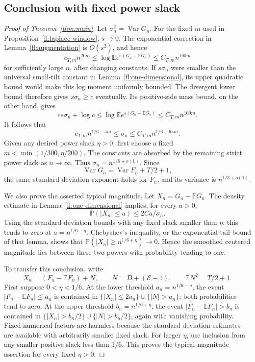 \subsection{Conclusion with fixed power slack}

\begin{proof}[Proof of Theorem~\ref{thm:main}]
Let $\sigma_n^2=\operatorname{Var}G_n$.  For the fixed $m$ used in
Proposition~\ref{fl:laplace-window}, $s\to0$.  The exponential
correction in Lemma~\ref{fl:augmentation} is $O(s^2)$, and hence
\[
 c_{T,m}n^{20m}\le
 \log\mathbb E e^{s(G_n-\mathbb EG_n)}
                         \le C_{T,m}n^{100m}
\]
for sufficiently large $n$, after changing constants.  If
$s\sigma_n$ were smaller than the universal small-tilt constant
in Lemma~\ref{fl:one-dimensional}, its upper quadratic bound would
make this log moment uniformly bounded.  The divergent lower bound
therefore gives $s\sigma_n\ge c$ eventually.  Its positive-side mass
bound, on the other hand, gives
\[
 cs\sigma_n+\log c
       \le\log\mathbb E e^{s(G_n-\mathbb EG_n)}
       \le C_{T,m}n^{100m}.
\]
It follows that
\[
 c_{T,m}n^{1/6-5m}\le\sigma_n
                  \le C_{T,m}n^{1/6+95m}.
\]
Given any desired power slack $\eta>0$, first choose a fixed
$m<\min(1/300,\eta/200)$.  The constants are absorbed by the remaining
strict power slack as $n\to\infty$.  Thus
$\sigma_n=n^{1/6+o(1)}$.  Since
\[
 \operatorname{Var}G_n=\operatorname{Var}F_n+T/2+1,
\]
the same standard-deviation exponent holds for $F_n$, and its variance
is $n^{1/3+o(1)}$.

We also prove the asserted typical magnitude.  Let
$X_n=G_n-\mathbb EG_n$.  The density estimate in
Lemma~\ref{fl:one-dimensional} implies, for every $a>0$,
\[
 \mathbb P(|X_n|\le a)\le 2Ca/\sigma_n.
\]
Using the standard-deviation bounds with any fixed slack smaller
than $\eta$, this tends to zero at $a=n^{1/6-\eta}$.  Chebyshev's
inequality, or the exponential-tail bound of that lemma, shows that
$\mathbb P(|X_n|\ge n^{1/6+\eta})\to0$.  Hence the smoothed centered
magnitude lies between these two powers with probability tending
to one.

To transfer this conclusion, write
\[
 X_n=(F_n-\mathbb EF_n)+N,\qquad
 N=D+(\mathcal E-1),\qquad \mathbb EN^2=T/2+1.
\]
First suppose $0<\eta<1/6$.  At the lower threshold
$a_n=n^{1/6-\eta}$, the event $|F_n-\mathbb EF_n|\le a_n$ is
contained in $\{|X_n|\le2a_n\}\cup\{|N|>a_n\}$; both probabilities
tend to zero.  At the upper threshold $b_n=n^{1/6+\eta}$, the event
$|F_n-\mathbb EF_n|>b_n$ is contained in
$\{|X_n|>b_n/2\}\cup\{|N|>b_n/2\}$, again with vanishing probability.
Fixed numerical factors are harmless because the standard-deviation
estimates are available with arbitrarily smaller fixed slack.
For larger $\eta$, use inclusion from any smaller positive slack
less than $1/6$.  This proves the typical-magnitude assertion for
every fixed $\eta>0$.


\end{proof}
